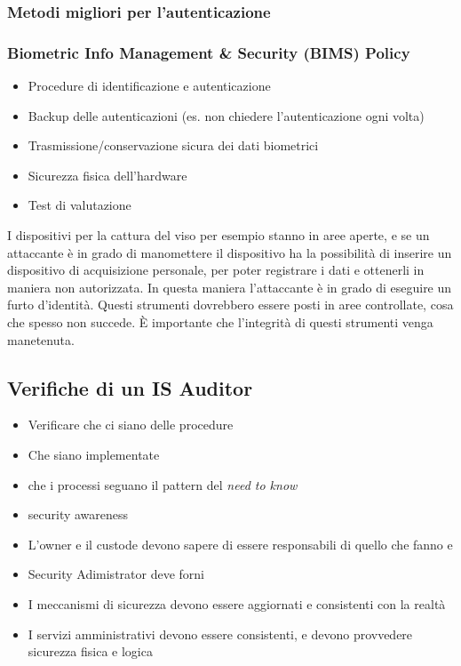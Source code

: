 \subsubsection{Metodi migliori per l'autenticazione}


\subsubsection{Biometric Info Management \& Security (BIMS) Policy}

\begin{itemize}
 \item Procedure di identificazione e autenticazione
 \item Backup delle autenticazioni (es. non chiedere l'autenticazione ogni 
 volta)
 \item Trasmissione/conservazione sicura dei dati biometrici
 \item Sicurezza fisica dell'hardware
 \item Test di valutazione
\end{itemize}

I dispositivi per la cattura del viso per esempio stanno in aree aperte, e se 
un attaccante è in grado di manomettere il dispositivo ha la possibilità di 
inserire un dispositivo di acquisizione personale, per poter registrare i dati 
e ottenerli in maniera non autorizzata. In questa maniera l'attaccante è in 
grado di eseguire un furto d'identità. Questi strumenti dovrebbero essere posti 
in aree controllate, cosa che spesso non succede. È importante che l'integrità 
di questi strumenti venga manetenuta.

\subsection{Verifiche di un IS Auditor}
\begin{itemize}
 \item Verificare che ci siano delle procedure
 \item Che siano implementate
 \item che i processi seguano il pattern del \textit{need to know}
 \item security awareness
 \item L'owner e il custode devono sapere di essere responsabili di quello che 
 fanno e 
 \item Security Adimistrator deve forni
 \item I meccanismi di sicurezza devono essere aggiornati e consistenti con la 
 realtà
 \item I servizi amministrativi devono essere consistenti, e devono provvedere 
 sicurezza fisica e logica
\end{itemize}

